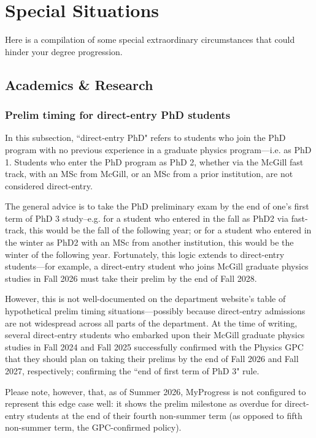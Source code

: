 
\chapter{Special Situations}

Here is a compilation of some special extraordinary circumstances that could hinder your degree progression.

\section{Academics \& Research}

\subsection{Prelim timing for direct-entry PhD students}        
        In this subsection, ``direct-entry PhD" refers to students who join the PhD program with no previous experience in a graduate physics program---i.e. as PhD 1. Students who enter the PhD program as PhD 2, whether via the McGill fast track, with an MSc from McGill, or an MSc from a prior institution, are not considered direct-entry. 
        
        The general advice is to take the PhD preliminary exam by the end of one's first term of PhD 3 study--e.g. for a student who entered in the fall as PhD2 via fast-track, this would be the fall of the following year; or for a student who entered in the winter as PhD2 with an MSc from another institution, this would be the winter of the following year. Fortunately, this logic extends to direct-entry students---for example, a direct-entry student who joins McGill graduate physics studies in Fall 2026 must take their prelim by the end of Fall 2028.

        However, this is not well-documented on the department website's table of hypothetical prelim timing situations---possibly because direct-entry admissions are not widespread across all parts of the department. At the time of writing, several direct-entry students who embarked upon their McGill graduate physics studies in Fall 2024 and Fall 2025 successfully confirmed with the Physics GPC that they should plan on taking their prelims by the end of Fall 2026 and Fall 2027, respectively; confirming the ``end of first term of PhD 3" rule. 
        
        Please note, however, that, as of Summer 2026, MyProgress is not configured to represent this edge case well: it shows the prelim milestone as overdue for direct-entry students at the end of their fourth non-summer term (as opposed to fifth non-summer term, the GPC-confirmed policy).

